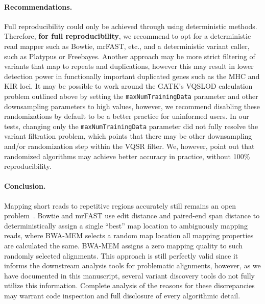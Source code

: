 \documentclass{bioinfo}
\begin{document}
\paragraph{Recommendations.}
 Full reproducibility could only be achieved through using deterministic methods. Therefore, {\bf for full reproducibility}, 
we recommend to opt for a deterministic read mapper such as Bowtie, mrFAST, etc., and a deterministic
variant caller, such as Platypus or Freebayes. Another approach may be more strict filtering of variants that map to repeats and duplications, however this may result in lower detection power in functionally important duplicated genes such as the MHC and KIR loci.
 It may be possible to work around the GATK's VQSLOD calculation problem outlined above by setting the {\tt maxNumTrainingData} parameter and other downsampling parameters to high values, however, we recommend disabling these randomizations by default to be a better practice for uninformed users. In our tests, changing only the {\tt maxNumTrainingData} parameter did not fully resolve the variant filtration problem, which points that there may be other downsampling and/or randomization step within the VQSR filter. We, however, point out that randomized algorithms may achieve better accuracy in practice, without 100\% reproducibility.


\paragraph{Conclusion.}

Mapping short reads to repetitive regions accurately still remains an open problem~\citep{Treangen2012}. Bowtie and mrFAST use 
edit distance and paired-end span distance 
to deterministically assign a single ``best'' map location to ambiguously mapping reads, where BWA-MEM selects a random map location all mapping properties are calculated the same. BWA-MEM assigns a zero mapping quality
to such randomly selected alignments. This approach is still perfectly valid since it informs the downstream analysis tools for problematic alignments, however, as we have documented in this manuscript, 
several variant discovery tools do not fully utilize this information. Complete analysis of the reasons for these discrepancies may warrant code inspection and full disclosure of every algorithmic detail.
\end{document}
